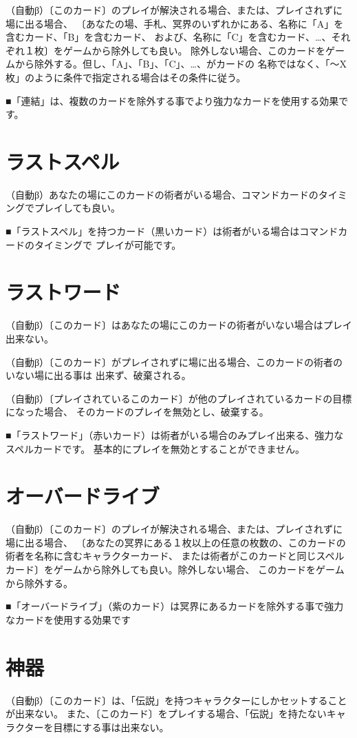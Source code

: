 \documentclass[fontsize=9pt,twocolumn,hanging_punctuation]{jlreq}
\begin{document}
（自動β）〔このカード〕のプレイが解決される場合、または、プレイされずに場に出る場合、
〔あなたの場、手札、冥界のいずれかにある、名称に「A」を含むカード、「B」を含むカード、
および、名称に「C」を含むカード、…、それぞれ１枚〕をゲームから除外しても良い。
除外しない場合、このカードをゲームから除外する。但し、「A」、「B」、「C」、…、がカードの
名称ではなく、「～X 枚」のように条件で指定される場合はその条件に従う。

■「連結」は、複数のカードを除外する事でより強力なカードを使用する効果です。

\section*{ラストスペル}
（自動β）あなたの場にこのカードの術者がいる場合、コマンドカードのタイミングでプレイしても良い。

■「ラストスペル」を持つカード（黒いカード）は術者がいる場合はコマンドカードのタイミングで
プレイが可能です。

\section*{ラストワード}
（自動β）〔このカード〕はあなたの場にこのカードの術者がいない場合はプレイ出来ない。

（自動β）〔このカード〕がプレイされずに場に出る場合、このカードの術者のいない場に出る事は
出来ず、破棄される。

（自動β）〔プレイされているこのカード〕が他のプレイされているカードの目標になった場合、
そのカードのプレイを無効とし、破棄する。

■「ラストワード」（赤いカード）は術者がいる場合のみプレイ出来る、強力なスペルカードです。
基本的にプレイを無効とすることができません。

\section*{オーバードライブ}
（自動β）〔このカード〕のプレイが解決される場合、または、プレイされずに場に出る場合、
〔あなたの冥界にある１枚以上の任意の枚数の、このカードの術者を名称に含むキャラクターカード、
または術者がこのカードと同じスペルカード〕をゲームから除外しても良い。除外しない場合、
このカードをゲームから除外する。

■「オーバードライブ」（紫のカード）は冥界にあるカードを除外する事で強力なカードを使用する効果です

\pagebreak
\section*{神器}
（自動β）〔このカード〕は、「伝説」を持つキャラクターにしかセットすることが出来ない。
また、〔このカード〕をプレイする場合、「伝説」を持たないキャラクターを目標にする事は出来ない。
\end{document}
